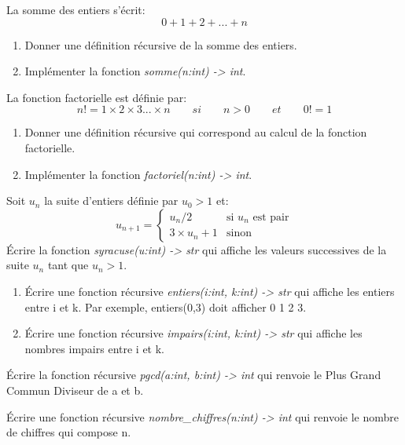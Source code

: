 \documentclass[a4paper,11pt]{article}
\begin{document}
\begin{Form}
\begin{exo}
La somme des entiers s'écrit:
$$0+1+2+...+n$$
\begin{enumerate}
\item Donner une définition récursive de la somme des entiers.
\item Implémenter la fonction \emph{somme(n:int) -> int}.
\end{enumerate}
\end{exo}
\begin{exo}
La fonction factorielle est définie par:
$$n!=1×2×3...×n \qquad si\qquad n>0 \qquad et \qquad 0!=1$$
\begin{enumerate}
\item Donner une définition récursive qui correspond au calcul de la fonction factorielle.
\item Implémenter la fonction \emph{factoriel(n:int) -> int}.
\end{enumerate}
\end{exo}
\begin{exo}
Soit $u_n$ la suite d'entiers définie par $u_0>1$ et:
$$
u_{n+1} = \left\{
    \begin{array}{ll}
        u_n/2 & \mbox{si  }u_n \mbox{ est pair}\\
        3×u_n+1 & \mbox{sinon}\
    \end{array}
\right.
$$
Écrire la fonction \emph{syracuse(u:int) -> str} qui affiche les valeurs successives de la suite $u_n$ tant que $u_n>1$.
\end{exo}
\begin{exo}
\begin{enumerate}
\item Écrire une fonction récursive \emph{entiers(i:int, k:int) -> str} qui affiche les entiers entre i et k. Par exemple, entiers(0,3) doit afficher 0 1 2 3.
\item Écrire une fonction récursive \emph{impairs(i:int, k:int) -> str} qui affiche les nombres impairs entre i et k.
\end{enumerate}
\end{exo}
\begin{exo}
Écrire la fonction récursive \emph{pgcd(a:int, b:int) -> int} qui renvoie le Plus Grand Commun Diviseur de a et b.
\end{exo}
\begin{exo}
Écrire une fonction récursive \emph{nombre\_chiffres(n:int) -> int} qui renvoie le nombre de chiffres qui compose n.
\end{exo}

\end{Form}
\end{document}
